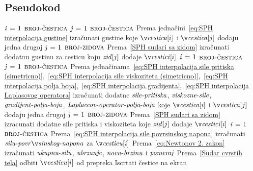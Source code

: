 \documentclass[12pt]{article}
\begin{document}
    \subsection{Pseudokod}

\begin{codebox}
\li \While {} \Do
\li     \For $\id{i} \gets 1$ \To $\const{broj-\v cestica}$ \Do
\li         \For $\id{j} \gets 1$ \To $\const{broj-\v cestica}$ \Do
\li             \Comment Prema jedna\v cini~\eqref{eq:SPH interpolacija gustine}
\li             izra\v cunati gustine koje $\id{\v cestica}[i]$ i $\id{\v cestica}[j]$ dodaju jedna drugoj
            \End
\li         \For $\id{j} \gets 1$ \To $\textnormal{\scshape broj-zidova}$ \Do
\li             \Comment Prema~\ref{SPH sudari sa zidom}
\li             izra\v cunati dodatnu gustinu za cesticu koju $\id{zid}[j]$ dodaje $\id{\v cestici}[i]$
            \End
        \End
\li     \For $\id{i} \gets 1$ \To $\const{broj-\v cestica}$ \Do
\li         \For $\id{j} \gets 1$ \To $\const{broj-\v cestica}$ \Do
\li             \Comment Prema jedna\v cinama~\eqref{eq:SPH interpolacija sile pritiska (simetricno)},~\eqref{eq:SPH interpolacija sile viskoziteta (simetricno)},~\eqref{eq:SPH interpolacija polja boja},~\eqref{eq:SPH interpolacija gradijenta},~\eqref{eq:SPH interpolacija Laplasovog operatora}
\li             izra\v cunati dodatne $\id{sile-pritiska}$, $\id{viskozne-sile}$,
\zi             $\id{gradijent-polja-boja}$, $\id{Laplaceov-operator-polja-boja}$
\zi             koje $\id{\v cestica}[i]$ i $\id{\v cestica}[j]$ dodaju jedna drugoj
            \End
\li         \For $\id{j} \gets 1$ \To $\textnormal{\scshape broj-zidova}$ \Do
\li             \Comment Prema~\ref{SPH sudari sa zidom}
\li             izracunati dodatne sile pritiska i viskoziteta
\zi             koje $\id{zid}[j]$ dodaje $\id{\v cestici}[i]$
            \End
        \End
\li     \For $\id{i} \gets 1$ \To $\const{broj-\v cestica}$ \Do
\li          \Comment Prema~\eqref{eq:SPH interpolacija sile povrsinskog napona}
\li          izra\v cunati $\id{silu-povr\v sinskog-napona}$ za $\id{\v cesticu}[i]$
\li          \Comment Prema~\eqref{eq:Newtonov 2. zakon}
\li          izra\v cunati $\id{ukupnu-silu}$, $\id{ubrzanje}$, $\id{novu-brzinu}$ i $\id{pomeraj}$
\li          \Comment Prema~\ref{Sudar cvrstih tela}
\li          odbiti $\id{\v cesticu}[i]$ od prepreka
        \End
\li     Iscrtati \v cestice na ekran
   \End
\end{codebox}
\end{document}
